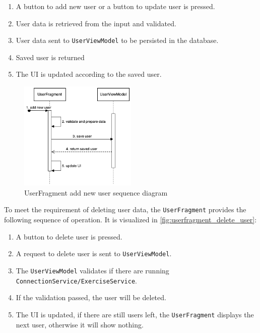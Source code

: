 \begin{enumerate}
    \item A button to add new user or a button to update user is pressed.
    \item User data is retrieved from the input and validated.
    \item User data sent to \texttt{UserViewModel} to be persisted in the database.
    \item Saved user is returned
    \item The UI is updated according to the saved user.
\end{enumerate}

\begin{figure}[H]
    \centering
    \includegraphics[width=0.5\textwidth]{diagrams/create-user-seq.drawio.png}
    \caption{UserFragment add new user sequence diagram}
    \label{fig:userfragment_add_new_user}
\end{figure}

To meet the requirement of deleting user data, the \texttt{UserFragment} provides the following sequence of operation. It is visualized in \autoref{fig:userfragment_delete_user}:

\begin{enumerate}
    \item A button to delete user is pressed.
    \item A request to delete user is sent to \texttt{UserViewModel}.
    \item The \texttt{UserViewModel} validates if there are running \texttt{ConnectionService/ExerciseService}.
    \item If the validation passed, the user will be deleted.
    \item The UI is updated, if there are still users left, the \texttt{UserFragment} displays the next user, otherwise it will show nothing.
\end{enumerate}



